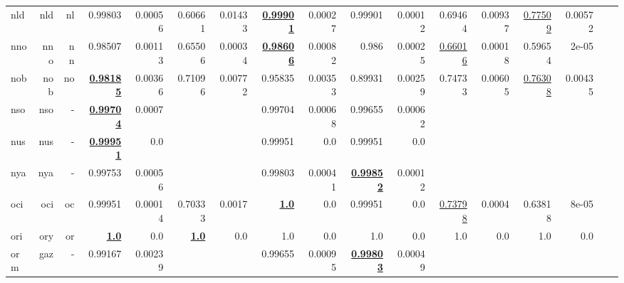 \documentclass[11pt]{article}
\begin{document}
\begin{table*}[h]
{\begin{tabular}{lrrrrrrrrrrrrrrrr}
nld         & nld         & nl         & 0.99803         & 0.00056         & 0.60661         & 0.01433         & \textbf{\underline{0.99901}}         & 0.00027         & 0.99901         & 0.00012         & 0.69464         & 0.00937         & \underline{0.77509}         & 0.00572         \\
nno         & nno         & nn         & 0.98507         & 0.00113         & 0.65506         & 0.00034         & \textbf{\underline{0.98606}}         & 0.00082         & 0.986         & 0.00025         & \underline{0.66016}         & 0.00018         & 0.59654         & 2e-05         \\
nob         & nob         & no         & \textbf{\underline{0.98185}}         & 0.00366         & 0.71096         & 0.00772         & 0.95835         & 0.00353         & 0.89931         & 0.00259         & 0.74733         & 0.00605         & \underline{0.76308}         & 0.00435         \\
nso         & nso         & -         & \textbf{\underline{0.99704}}         & 0.0007         &          &          & 0.99704         & 0.00068         & 0.99655         & 0.00062         &          &          &          &          \\
nus         & nus         & -         & \textbf{\underline{0.99951}}         & 0.0         &          &          & 0.99951         & 0.0         & 0.99951         & 0.0         &          &          &          &          \\
nya         & nya         & -         & 0.99753         & 0.00056         &          &          & 0.99803         & 0.00041         & \textbf{\underline{0.99852}}         & 0.00012         &          &          &          &          \\
oci         & oci         & oc         & 0.99951         & 0.00014         & 0.70333         & 0.0017         & \textbf{\underline{1.0}}         & 0.0         & 0.99951         & 0.0         & \underline{0.73798}         & 0.0004         & 0.63818         & 8e-05         \\
ori         & ory         & or         & \textbf{\underline{1.0}}         & 0.0         & \textbf{\underline{1.0}}         & 0.0         & 1.0         & 0.0         & 1.0         & 0.0         & 1.0         & 0.0         & 1.0         & 0.0         \\
orm         & gaz         & -         & 0.99167         & 0.00239         &          &          & 0.99655         & 0.00095         & \textbf{\underline{0.99803}}         & 0.00049         &          &          &          &          \\

\end{tabular}}
\end{table*}
\end{document}
